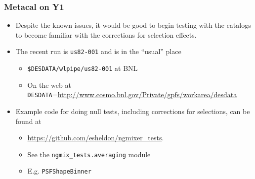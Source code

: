 \documentclass{beamer}
\begin{document}
\frame
{
    \frametitle{Metacal on Y1}

 
    \begin{itemize}

        \item Despite the known issues, it would be good to begin testing
            with the catalogs to become familiar with the corrections
            for selection effects.

        \item The recent run is \texttt{us82-001} and is in the ``usual'' place
            \begin{itemize}
                \item \texttt{\$DESDATA/wlpipe/us82-001} at BNL
                \item On the web at
                    \texttt{DESDATA}=\url{http://www.cosmo.bnl.gov/Private/gpfs/workarea/desdata}
            \end{itemize}

        \item Example code for doing null tests, including corrections
            for selections, can be found at
            \begin{itemize}
                \item \url{https://github.com/esheldon/ngmixer\_tests}.
                \item See the \texttt{ngmix\_tests.averaging} module
                \item E.g. \texttt{PSFShapeBinner}
            \end{itemize}
    \end{itemize}

}
\end{document}
